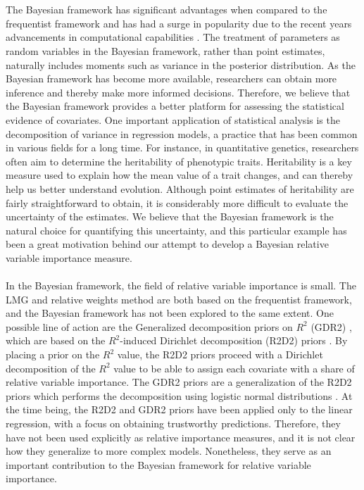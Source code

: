 \\
\\
The Bayesian framework has significant advantages when compared to the frequentist framework \citep{robert2007bayesian} and has had a surge in popularity due to the recent years advancements in computational capabilities \citep{hackenberger2019bayes}. The treatment of parameters as random variables in the Bayesian framework, rather than point estimates, naturally includes moments such as variance in the posterior distribution. As the Bayesian framework has become more available, researchers can obtain more inference and thereby make more informed decisions. Therefore, we believe that the Bayesian framework provides a better platform for assessing the statistical evidence of covariates. One important application of statistical analysis is the decomposition of variance in regression models, a practice that has been common in various fields for a long time. For instance, in quantitative genetics, researchers often aim to determine the heritability of phenotypic traits. Heritability is a key measure used to explain how the mean value of a trait changes, and can thereby help us better understand evolution. Although point estimates of heritability are fairly straightforward to obtain, it is considerably more difficult to evaluate the uncertainty of the estimates. We believe that the Bayesian framework is the natural choice for quantifying this uncertainty, and this particular example has been a great motivation behind our attempt to develop a Bayesian relative variable importance measure.
\\
\\
In the Bayesian framework, the field of relative variable importance is small. The LMG and relative weights method are both based on the frequentist framework, and the Bayesian framework has not been explored to the same extent. One possible line of action are the Generalized decomposition priors on $R^2$ (GDR2) \citep{aguilar2024generalized}, which are based on the $R^2$-induced Dirichlet decomposition (R2D2) priors \citep{zhang2020bayesian}. By placing a prior on the $R^2$ value, the R2D2 priors proceed with a Dirichlet decomposition of the $R^2$ value to be able to assign each covariate with a share of relative variable importance. The GDR2 priors are a generalization of the R2D2 priors which performs the decomposition using logistic normal distributions \citep{aguilar2024generalized}. At the time being, the R2D2 and GDR2 priors have been applied only to the linear regression, with a focus on obtaining trustworthy predictions. Therefore, they have not been used explicitly as relative importance measures, and it is not clear how they generalize to more complex models. Nonetheless, they serve as an important contribution to the Bayesian framework for relative variable importance.
